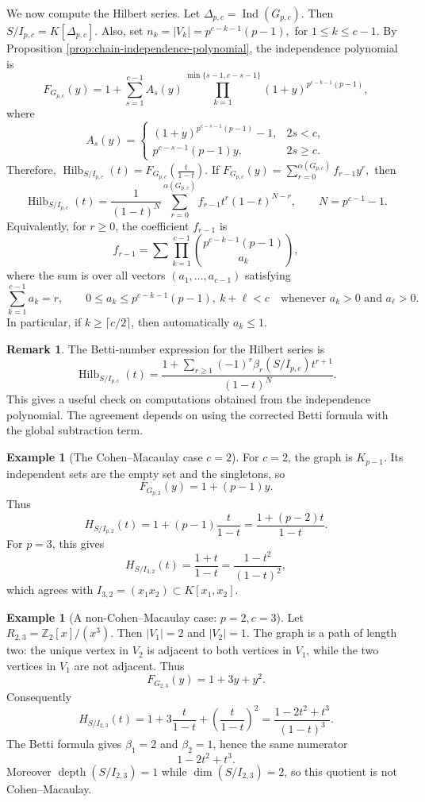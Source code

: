 \documentclass[12pt]{article}
\theoremstyle{definition}
\newtheorem{example}[theorem]{Example}
\newtheorem{remark}[theorem]{Remark}
\begin{document}
We now compute the Hilbert series.  Let $\Delta_{p,c}=\operatorname{Ind}(G_{p,c})$.  Then $S/I_{p,c}=K[\Delta_{p,c}]$.  Also, set
$ n_k=|V_k|=p^{c-k-1}(p-1),$ for $1\leq k\leq c-1. $ By Proposition \ref{prop:chain-independence-polynomial}, the independence polynomial is
$$
F_{G_{p,c}}(y)=1+\sum_{s=1}^{c-1}A_s(y)\prod_{k=1}^{\min\{s-1,c-s-1\}}(1+y)^{p^{c-k-1}(p-1)},
$$
where
$$
A_s(y)=
\begin{cases}
	(1+y)^{p^{c-s-1}(p-1)}-1, & 2s<c,\\[2pt]
	p^{c-s-1}(p-1)y, & 2s\geq c.
\end{cases}
$$
Therefore, 
$
\operatorname{Hilb}_{S/I_{p,c}}(t)=F_{G_{p,c}}\left(\frac{t}{1-t}\right).
$
If
$
F_{G_{p,c}}(y)=\sum_{r=0}^{\alpha(G_{p,c})}f_{r-1}y^r,
$
then
$$
\operatorname{Hilb}_{S/I_{p,c}}(t)=\frac{1}{(1-t)^N}\sum_{r=0}^{\alpha(G_{p,c})}f_{r-1}t^r(1-t)^{N-r},\qquad N=p^{c-1}-1.
$$
Equivalently, for $r\geq 0$, the coefficient $f_{r-1}$ is
$$
f_{r-1}=\sum\prod_{k=1}^{c-1}\binom{p^{c-k-1}(p-1)}{a_k},
$$
where the sum is over all vectors $(a_1,\ldots,a_{c-1})$ satisfying
$$
\sum_{k=1}^{c-1}a_k=r,
\qquad
0\leq a_k\leq p^{c-k-1}(p-1), ~k+\ell<c\quad\text{whenever }a_k>0\text{ and }a_\ell>0.
$$
In particular, if $k\geq \lceil c/2\rceil$, then automatically $a_k\leq 1$.

\medskip

\begin{remark}\label{rem:pc-hilbert-betti-check}
	The Betti-number expression for the Hilbert series is
	$$
	\operatorname{Hilb}_{S/I_{p,c}}(t)=
	\frac{1+\sum_{r\geq 1}(-1)^r\beta_r(S/I_{p,c})t^{r+1}}{(1-t)^N}.
	$$
	This gives a useful check on computations obtained from the independence polynomial.  The agreement depends on using the corrected Betti formula with the global subtraction term.
\end{remark}

\medskip
\begin{example}[The Cohen--Macaulay case \(c=2\)]
	For \(c=2\), the graph is \(K_{p-1}\).  Its independent sets are the empty set and the singletons, so
	\[
	F_{G_{p,2}}(y)=1+(p-1)y.
	\]
	Thus
	\[
	H_{S/I_{p,2}}(t)=1+(p-1)\frac{t}{1-t}
	=\frac{1+(p-2)t}{1-t}.
	\]
	For \(p=3\), this gives
	\[
	H_{S/I_{3,2}}(t)=\frac{1+t}{1-t}
	=\frac{1-t^2}{(1-t)^2},
	\]
	which agrees with \(I_{3,2}=(x_1x_2)\subset K[x_1,x_2]\).
\end{example}

\begin{example}[A non-Cohen--Macaulay case: \(p=2,c=3\)]
	Let \(R_{2,3}=\mathbb{Z}_2[x]/(x^3)\).  Then \(|V_1|=2\) and \(|V_2|=1\).  The graph is a path of length two: the unique vertex in \(V_2\) is adjacent to both vertices in \(V_1\), while the two vertices in \(V_1\) are not adjacent.  Thus
	\[
	F_{G_{2,3}}(y)=1+3y+y^2.
	\]
	Consequently
	\[
	H_{S/I_{2,3}}(t)
	=1+3\frac{t}{1-t}+\left(\frac{t}{1-t}\right)^2
	=\frac{1-2t^2+t^3}{(1-t)^3}.
	\]
	The Betti formula gives \(\beta_1=2\) and \(\beta_2=1\), hence the same numerator
	\[
	1-2t^2+t^3.
	\]
	Moreover \(\operatorname{depth}(S/I_{2,3})=1\) while \(\dim(S/I_{2,3})=2\), so this quotient is not Cohen--Macaulay.
\end{example}
\end{document}
